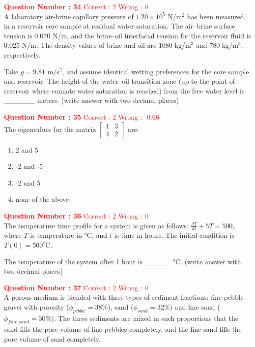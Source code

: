 \documentclass[12pt]{article}
\begin{document}
{\textbf{\textcolor{red}{Question Number : 34}} \hfill \textcolor{red}{Correct : 2  Wrong : 0} \\[1ex]
A laboratory air-brine capillary pressure of $1.20 \times 10^5$ N/m$^2$ has been measured in a reservoir core sample at residual water saturation. The air–brine surface tension is 0.070 N/m, and the brine–oil interfacial tension for the reservoir fluid is 0.025 N/m. The density values of brine and oil are 1080 kg/m$^3$ and 780 kg/m$^3$, respectively.

Take $g = 9.81$ m/s$^2$, and assume identical wetting preferences for the core sample and reservoir. The height of the water–oil transition zone (up to the point of reservoir where connate water saturation is reached) from the free water level is \_\_\_\_\_\_ meters. (write answer with two decimal places)

\vspace{3ex}

\textbf{\textcolor{red}{Question Number : 35}} \hfill \textcolor{red}{Correct : 2 \quad Wrong : -0.66} \\[1ex]
The eigenvalues for the matrix 
$ 
\begin{bmatrix}
1 & 3 \\
4 & 2
\end{bmatrix}
$ 
are:

\begin{enumerate}[label=(\Alph*)]
    \item 2 and 5
    \item -2 and -5
    \item -2 and 5
    \item none of the above
\end{enumerate}

\vspace{2ex}

\textbf{\textcolor{red}{Question Number : 36}} \hfill \textcolor{red}{Correct : 2  Wrong : 0} \\[1ex]
The temperature time profile for a system is given as follows:
{\LARGE$ 
\frac{dT}{dt} + 5T = 500,
$ }
where $T$ is temperature in °C, and $t$ is time in hours. The initial condition is $T(0) = 500^\circ$C.

The temperature of the system after 1 hour is \_\_\_\_\_ °C. (write answer with two decimal places)

\vspace{3ex}

\textbf{\textcolor{red}{Question Number : 37}} \hfill \textcolor{red}{Correct : 2  Wrong : 0} \\[1ex]
A porous medium is blended with three types of sediment fractions: fine pebble gravel with porosity ($\phi_{pebble} = 38\%$), sand ($\phi_{sand} = 32\%$) and fine sand ($\phi_{fine\_sand} = 30\%$). The three sediments are mixed in such proportions that the sand fills the pore volume of fine pebbles completely, and the fine sand fills the pore volume of sand completely.

}
\end{document}
